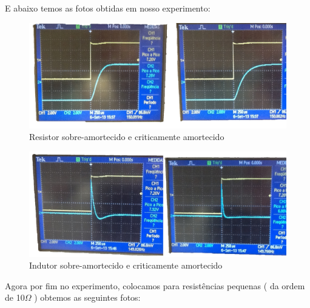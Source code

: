 \documentclass[12pt,letterpaper]{article}
\begin{document}
E abaixo temos as fotos obtidas em nosso experimento:
\begin{figure}[!htb]
  \centering
  \label{tabela}
  \includegraphics[scale=0.18]{img/rcrit.jpg}
  \caption{Resistor sobre-amortecido e criticamente amortecido}
\end{figure}
\begin{figure}[!htb]
  \centering
  \label{tabela}
  \includegraphics[scale=0.18]{img/indcrit.jpg}
  \caption{Indutor sobre-amortecido e criticamente amortecido}
\end{figure}
Agora por fim no experimento, colocamos para resistências pequenas ( da ordem de 10$\Omega$ ) obtemos as seguintes fotos:
\end{document}
